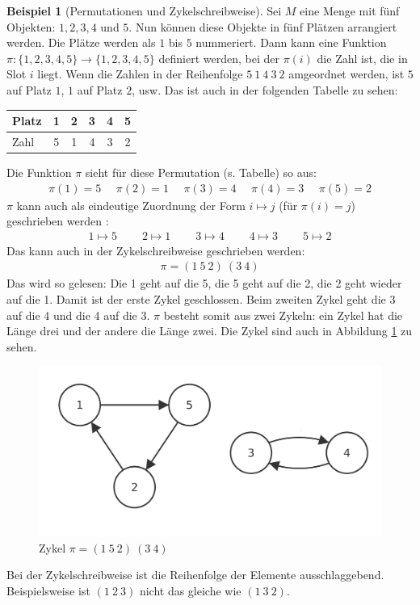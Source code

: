 \documentclass[12pt,a4paper, usenames, dvipsnames]{article}
\theoremstyle{mystyle}
\theoremstyle{definition}
\newtheorem{bsp}{Beispiel}[definition]
\begin{document}
\begin{bsp}[Permutationen und Zykelschreibweise]
Sei $M$ eine Menge mit fünf Objekten: $1, 2, 3, 4$ und $5$. Nun können diese Objekte in fünf Plätzen arrangiert werden. Die Plätze werden als $1$ bis $5$ nummeriert. Dann kann eine Funktion $\pi :\{1,2,3,4,5\} \rightarrow \{1,2,3,4,5\}$ definiert werden, bei der $\pi (i)$ die Zahl ist, die in Slot $i$ liegt.
Wenn die Zahlen in der Reihenfolge $5 \ 1\ 4\ 3 \ 2$ amgeordnet werden, ist $5$ auf Platz $1$, $1$ auf Platz $2$, usw. Das ist auch in der folgenden Tabelle zu sehen: 

\begin{center}
\begin{tabular}{l ccccc}

Platz & 1 & 2 & 3 & 4 & 5 \\
\midrule
Zahl & 5 & 1 & 4 & 3 & 2 \\

\end{tabular}
\end{center}

Die Funktion $\pi$ sieht für diese Permutation (s. Tabelle) so aus:
\begin{align*}
\pi(1) = 5 \ \ \ \ \ \  \pi(2) = 1 \ \ \ \ \ \ \pi(3) = 4 \ \ \ \ \ \ \pi(4) = 3 \ \ \ \ \ \ \pi(5) = 2 
\end{align*}
$\pi$ kann auch als eindeutige Zuordnung der Form $i \mapsto j$ (für $\pi(i)=j$) geschrieben werden \cite{JC}:
\begin{align*}
1 \mapsto 5 \ \ \ \ \ \ \ \ \ \  2\mapsto 1 \ \ \ \ \ \ \ \ \ \ 3\mapsto 4 \ \ \ \ \ \ \ \ \ \ 4\mapsto 3 \ \ \ \ \ \ \ \ \ \ 5\mapsto 2 
\end{align*}
Das kann auch in der Zykelschreibweise geschrieben werden:
\begin{align*}
\pi = (1 \ 5 \ 2)\ (3 \ 4)
\end{align*}
Das wird so gelesen: Die 1 geht auf die 5, die 5 geht auf die 2, die 2 geht wieder auf die 1. Damit ist der erste Zykel geschlossen. Beim zweiten Zykel geht die 3 auf die 4 und die 4 auf die 3. $\pi$ besteht somit aus zwei Zykeln: ein Zykel hat die Länge drei und der andere die Länge zwei. Die Zykel sind auch in Abbildung \ref{Abbildung_ZykelVonf} zu sehen.
\begin{figure}[H]
\centering
\includegraphics[scale=0.13]{Zykel_152.png}
\caption{Zykel $\pi = (1 \ 5 \ 2)\ (3 \ 4)$}
\label{Abbildung_ZykelVonf}
\end{figure}
Bei der Zykelschreibweise ist die Reihenfolge der Elemente ausschlaggebend. Beispielsweise ist $(1 \ 2 \ 3)$ nicht das gleiche wie $(1 \ 3 \ 2)$. 


\end{bsp}
\end{document}
